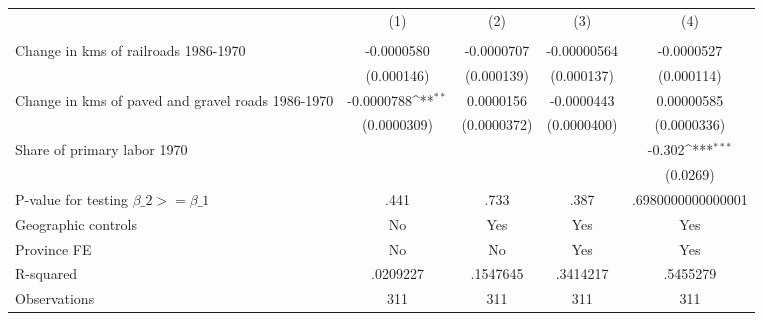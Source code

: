 {
\def\sym#1{\ifmmode^{#1}\else\(^{#1}\)\fi}
\begin{tabular}{l*{4}{c}}
\hline\hline
                &\multicolumn{1}{c}{(1)}&\multicolumn{1}{c}{(2)}&\multicolumn{1}{c}{(3)}&\multicolumn{1}{c}{(4)}\\
                &\multicolumn{1}{c}{}&\multicolumn{1}{c}{}&\multicolumn{1}{c}{}&\multicolumn{1}{c}{}\\
\hline
Change in kms of railroads 1986-1970&-0.0000580         &-0.0000707         &-0.00000564         &-0.0000527         \\
                &(0.000146)         &(0.000139)         &(0.000137)         &(0.000114)         \\
[1em]
Change in kms of paved and gravel roads 1986-1970&-0.0000788\sym{**} &0.0000156         &-0.0000443         &0.00000585         \\
                &(0.0000309)         &(0.0000372)         &(0.0000400)         &(0.0000336)         \\
[1em]
Share of primary labor 1970&                  &                  &                  &   -0.302\sym{***}\\
                &                  &                  &                  & (0.0269)         \\
\hline
P-value for testing $\beta\_{2} >= \beta\_{1}$&     .441         &     .733         &     .387         &.6980000000000001         \\
Geographic controls&       No         &      Yes         &      Yes         &      Yes         \\
Province FE     &       No         &       No         &      Yes         &      Yes         \\
R-squared       & .0209227         & .1547645         & .3414217         & .5455279         \\
Observations    &      311         &      311         &      311         &      311         \\
\hline\hline
\end{tabular}
}

